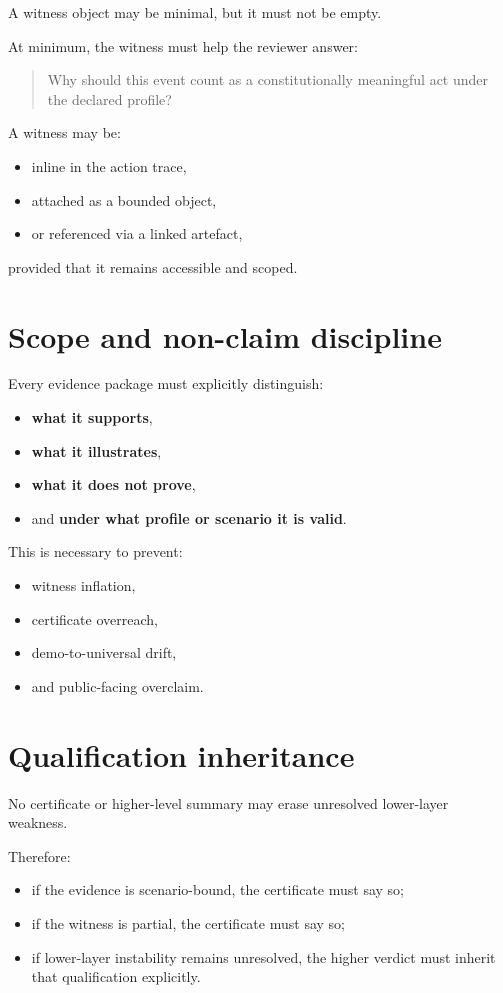 \documentclass[11pt]{article}
\begin{document}
A witness object may be minimal, but it must not be empty.

At minimum, the witness must help the reviewer answer:

\begin{quote}
Why should this event count as a constitutionally meaningful act under the declared profile?
\end{quote}

A witness may be:
\begin{itemize}[leftmargin=2em]
    \item inline in the action trace,
    \item attached as a bounded object,
    \item or referenced via a linked artefact,
\end{itemize}
provided that it remains accessible and scoped.

\section{Scope and non-claim discipline}

Every evidence package must explicitly distinguish:
\begin{itemize}[leftmargin=2em]
    \item \textbf{what it supports},
    \item \textbf{what it illustrates},
    \item \textbf{what it does not prove},
    \item and \textbf{under what profile or scenario it is valid}.
\end{itemize}

This is necessary to prevent:
\begin{itemize}[leftmargin=2em]
    \item witness inflation,
    \item certificate overreach,
    \item demo-to-universal drift,
    \item and public-facing overclaim.
\end{itemize}

\section{Qualification inheritance}

No certificate or higher-level summary may erase unresolved lower-layer weakness.

Therefore:
\begin{itemize}[leftmargin=2em]
    \item if the evidence is scenario-bound, the certificate must say so;
    \item if the witness is partial, the certificate must say so;
    \item if lower-layer instability remains unresolved, the higher verdict must inherit that qualification explicitly.
\end{itemize}
\end{document}
